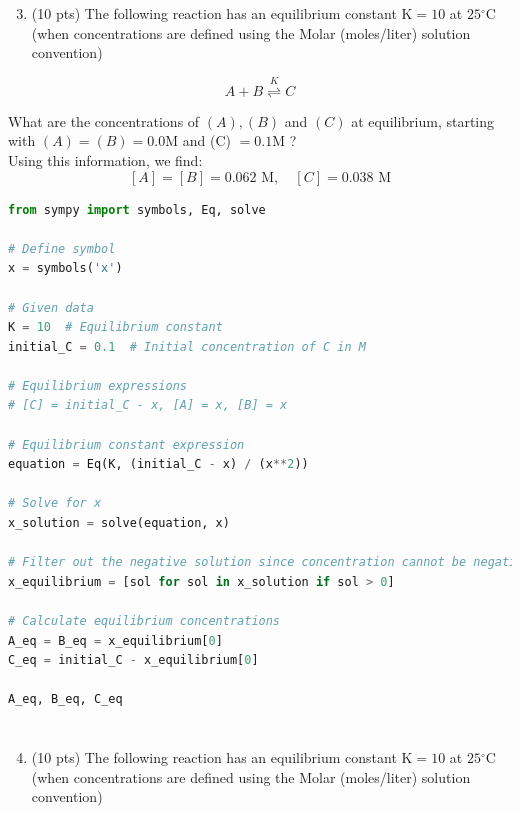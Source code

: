\documentclass[12 pt]{article}
\begin{document}
\section{}
\begin{enumerate}
  \setcounter{enumi}{2}
  \item (10 pts) The following reaction has an equilibrium constant $\mathrm{K}=10$ at $25{ }^{\circ} \mathrm{C}$ (when concentrations are defined using the Molar (moles/liter) solution convention)
\end{enumerate}

$$
A+B \stackrel{K}{\rightleftharpoons} C
$$

What are the concentrations of $(A),(B)$ and $(C)$ at equilibrium, starting with $(A)=(B)=0.0 \mathrm{M}$ and (C) $=0.1 \mathrm{M}$ ? \\
Using this information, we find:
\begin{equation}
\boxed{[A] = [B] = 0.062 \text{ M}, \quad [C] = 0.038 \text{ M}}
\end{equation}
\begin{lstlisting}[language=Python]
from sympy import symbols, Eq, solve

# Define symbol
x = symbols('x')

# Given data
K = 10  # Equilibrium constant
initial_C = 0.1  # Initial concentration of C in M

# Equilibrium expressions
# [C] = initial_C - x, [A] = x, [B] = x

# Equilibrium constant expression
equation = Eq(K, (initial_C - x) / (x**2))

# Solve for x
x_solution = solve(equation, x)

# Filter out the negative solution since concentration cannot be negative
x_equilibrium = [sol for sol in x_solution if sol > 0]

# Calculate equilibrium concentrations
A_eq = B_eq = x_equilibrium[0]
C_eq = initial_C - x_equilibrium[0]

A_eq, B_eq, C_eq

\end{lstlisting}
\section{}
\begin{enumerate}
  \setcounter{enumi}{3}
  \item (10 pts) The following reaction has an equilibrium constant $\mathrm{K}=10$ at $25{ }^{\circ} \mathrm{C}$ (when concentrations are defined using the Molar (moles/liter) solution convention)
\end{enumerate}
\end{document}
